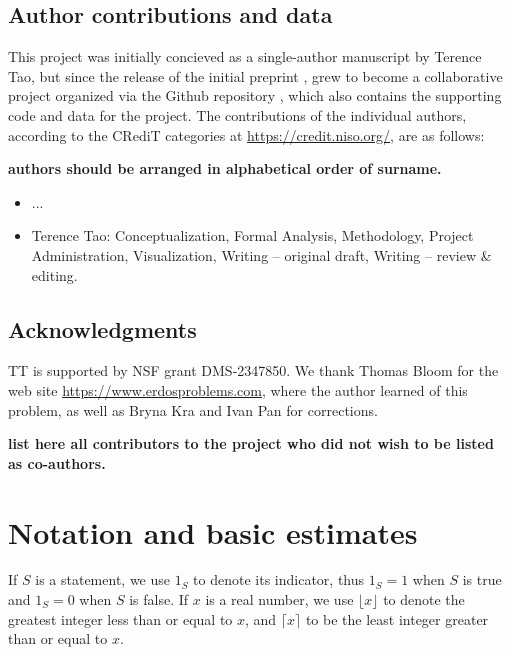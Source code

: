 \documentclass[12pt,a4paper,reqno]{amsart}
\numberwithin{equation}{section}
\theoremstyle{plain}
\theoremstyle{definition}
\begin{document}
\subsection{Author contributions and data}

This project was initially concieved as a single-author manuscript by Terence Tao, but since the release of the initial preprint \cite{tao}, grew to become a collaborative project organized via the Github repository \cite{github}, which also contains the supporting code and data for the project.  The contributions of the individual authors, according to the CRediT categories at \url{https://credit.niso.org/}, are as follows:

{\bf authors should be arranged in alphabetical order of surname.  }

\begin{itemize}
\item ...
\item Terence Tao: Conceptualization, Formal Analysis, Methodology, Project Administration, Visualization, Writing -- original draft, Writing -- review \& editing.
\end{itemize}

\subsection{Acknowledgments}

TT is supported by NSF grant DMS-2347850.  We thank Thomas Bloom for the web site \url{https://www.erdosproblems.com}, where the author learned of this problem, as well as Bryna Kra and Ivan Pan for  corrections.

{\bf list here all contributors to the project who did not wish to be listed as co-authors.}


\section{Notation and basic estimates}

If $S$ is a statement, we use $1_S$ to denote its indicator, thus $1_S=1$ when $S$ is true and $1_S=0$ when $S$ is false.  If $x$ is a real number, we use $\lfloor x \rfloor$ to denote the greatest integer less than or equal to $x$, and $\lceil x \rceil$ to be the least integer greater than or equal to $x$.
\end{document}
